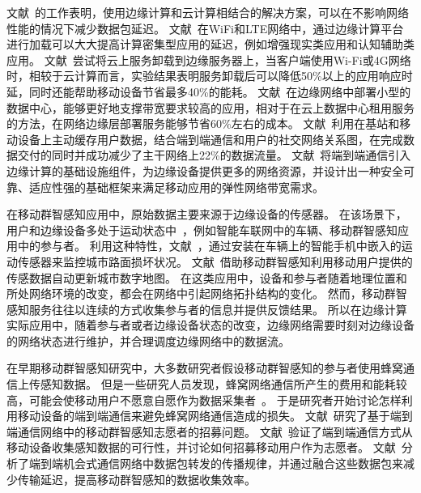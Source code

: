 文献~\cite{DBLP:conf/infocom/RimalVM16}的工作表明，使用边缘计算和云计算相结合的解决方案，可以在不影响网络性能的情况下减少数据包延迟。
文献~\cite{DBLP:conf/apsys/HuGHWACPS16}在WiFi和LTE网络中，通过边缘计算平台进行加载可以大大提高计算密集型应用的延迟，例如增强现实类应用和认知辅助类应用。
文献~\cite{gao2015cloudlets}尝试将云上服务卸载到边缘服务器上，当客户端使用Wi-Fi或4G网络时，相较于云计算而言，实验结果表明服务卸载后可以降低50\%以上的应用响应时延，同时还能帮助移动设备节省最多40\%的能耗。
文献~\cite{DBLP:conf/saso/MehtaTKTKE16}在边缘网络中部署小型的数据中心，能够更好地支撑带宽要求较高的应用，相对于在云上数据中心租用服务的方法，在网络边缘层部署服务能够节省60\%左右的成本。
文献~\cite{DBLP:journals/cm/BastugBD14}利用在基站和移动设备上主动缓存用户数据，结合端到端通信和用户的社交网络关系图，在完成数据交付的同时并成功减少了主干网络上22\%的数据流量。
文献~\cite{DBLP:conf/mwcn/OrsiniBL15}将端到端通信引入边缘计算的基础设施组件，为边缘设备提供更多的网络资源，并设计出一种安全可靠、适应性强的基础框架来满足移动应用的弹性网络带宽需求。

在移动群智感知应用中，原始数据主要来源于边缘设备的传感器。
在该场景下，用户和边缘设备多处于运动状态中~\cite{DBLP:journals/jsac/LyuNTLWGP17}，例如智能车联网中的车辆、移动群智感知应用中的参与者。
利用这种特性，文献~\cite{DBLP:conf/itsc/PiaoA17}，通过安装在车辆上的智能手机中嵌入的运动传感器来监控城市路面损坏状况。
文献~\cite{DBLP:journals/tase/PengGXGY18}借助移动群智感知利用移动用户提供的传感数据自动更新城市数字地图。
在这类应用中，设备和参与者随着地理位置和所处网络环境的改变，都会在网络中引起网络拓扑结构的变化。
然而，移动群智感知服务往往以连续的方式收集参与者的信息并提供反馈结果。
所以在边缘计算实际应用中，随着参与者或者边缘设备状态的改变，边缘网络需要时刻对边缘设备的网络状态进行维护，并合理调度边缘网络中的数据流。

在早期移动群智感知研究中，大多数研究者假设移动群智感知的参与者使用蜂窝通信上传感知数据。
但是一些研究人员发现，蜂窝网络通信所产生的费用和能耗较高，可能会使移动用户不愿意自愿作为数据采集者~\cite{DBLP:conf/globecom/ZhangJLLC16,DBLP:conf/icdcs/XiaoWHHH16}。
于是研究者开始讨论怎样利用移动设备的端到端通信来避免蜂窝网络通信造成的损失。
文献~\cite{DBLP:conf/infocom/KaraliopoulosTK15}研究了基于端到端通信网络中的移动群智感知志愿者的招募问题。
文献~\cite{DBLP:journals/puc/WangLL17}验证了端到端通信方式从移动设备收集感知数据的可行性，并讨论如何招募移动用户作为志愿者。 
文献~\cite{DBLP:journals/tpds/ZhaoMTL15}分析了端到端机会式通信网络中数据包转发的传播规律，并通过融合这些数据包来减少传输延迟，提高移动群智感知的数据收集效率。

